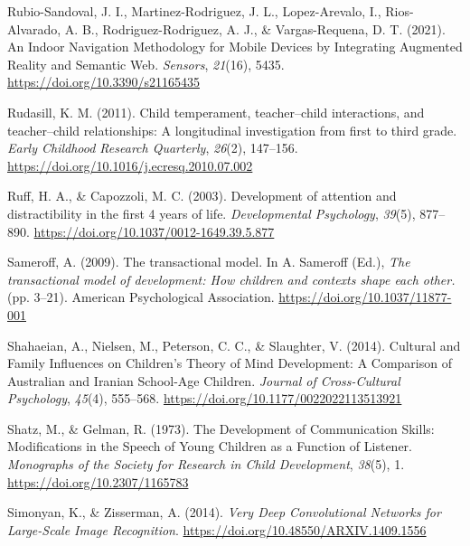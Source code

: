 \documentclass[
  english,
  12pt,
  man,floatsintext]{apa6}
\newlength{\cslhangindent}
\newenvironment{CSLReferences}[2] %
 {\begin{list}{}{%
  \setlength{\itemindent}{0pt}
  \setlength{\leftmargin}{0pt}
  \setlength{\parsep}{0pt}
  \ifodd #1
   \setlength{\leftmargin}{\cslhangindent}
   \setlength{\itemindent}{-1\cslhangindent}
  \fi
  \setlength{\itemsep}{#2\baselineskip}}}
 {\end{list}}
\begin{document}
\begin{CSLReferences}{1}{0}
Rubio-Sandoval, J. I., Martinez-Rodriguez, J. L., Lopez-Arevalo, I., Rios-Alvarado, A. B., Rodriguez-Rodriguez, A. J., \& Vargas-Requena, D. T. (2021). An {Indoor Navigation Methodology} for {Mobile Devices} by {Integrating Augmented Reality} and {Semantic Web}. \emph{Sensors}, \emph{21}(16), 5435. \url{https://doi.org/10.3390/s21165435}

Rudasill, K. M. (2011). Child temperament, teacher--child interactions, and teacher--child relationships: {A} longitudinal investigation from first to third grade. \emph{Early Childhood Research Quarterly}, \emph{26}(2), 147--156. \url{https://doi.org/10.1016/j.ecresq.2010.07.002}

Ruff, H. A., \& Capozzoli, M. C. (2003). Development of attention and distractibility in the first 4 years of life. \emph{Developmental Psychology}, \emph{39}(5), 877--890. \url{https://doi.org/10.1037/0012-1649.39.5.877}

Sameroff, A. (2009). The transactional model. In A. Sameroff (Ed.), \emph{The transactional model of development: {How} children and contexts shape each other.} (pp. 3--21). American Psychological Association. \url{https://doi.org/10.1037/11877-001}

Shahaeian, A., Nielsen, M., Peterson, C. C., \& Slaughter, V. (2014). Cultural and {Family Influences} on {Children}'s {Theory} of {Mind Development}: {A Comparison} of {Australian} and {Iranian School-Age Children}. \emph{Journal of Cross-Cultural Psychology}, \emph{45}(4), 555--568. \url{https://doi.org/10.1177/0022022113513921}

Shatz, M., \& Gelman, R. (1973). The {Development} of {Communication Skills}: {Modifications} in the {Speech} of {Young Children} as a {Function} of {Listener}. \emph{Monographs of the Society for Research in Child Development}, \emph{38}(5), 1. \url{https://doi.org/10.2307/1165783}

Simonyan, K., \& Zisserman, A. (2014). \emph{Very {Deep Convolutional Networks} for {Large-Scale Image Recognition}}. \url{https://doi.org/10.48550/ARXIV.1409.1556}


\end{CSLReferences}
\end{document}
